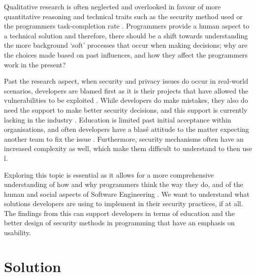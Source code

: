 \par Qualitative research is often neglected and overlooked in favour of more quantitative reasoning and technical traits such as the security method used or the programmers task-completion rate \cite{3}. Programmers provide a human aspect to a technical solution and therefore, there should be a shift towards understanding the more background ‘soft’ processes that occur when making decisions; why are the choices made based on past influences, and how they affect the programmers work in the present?
\newline
\par Past the research aspect, when security and privacy issues do occur in real-world scenarios, developers are blamed first as it is their projects that have allowed the vulnerabilities to be exploited \cite{4}. While developers do make mistakes, they also do need the support to make better security decisions, and this support is currently lacking in the industry \cite{4}. Education is limited past initial acceptance within organisations, and often developers have a blasé attitude to the matter expecting another team to fix the issue \cite{5}. Furthermore, security mechanisms often have an increased complexity as well, which make them difficult to understand to then use \cite{6}l.
\newline
\par Exploring this topic is essential as it allows for a more comprehensive understanding of how and why programmers think the way they do, and of the human and social aspects of Software Engineering \cite{geeks}. We want to understand what solutions developers are using to implement in their security practices, if at all. The findings from this can support developers in terms of education and the better design of security methods in programming \cite{summary1} that have an emphasis on usability.

\section{Solution}

